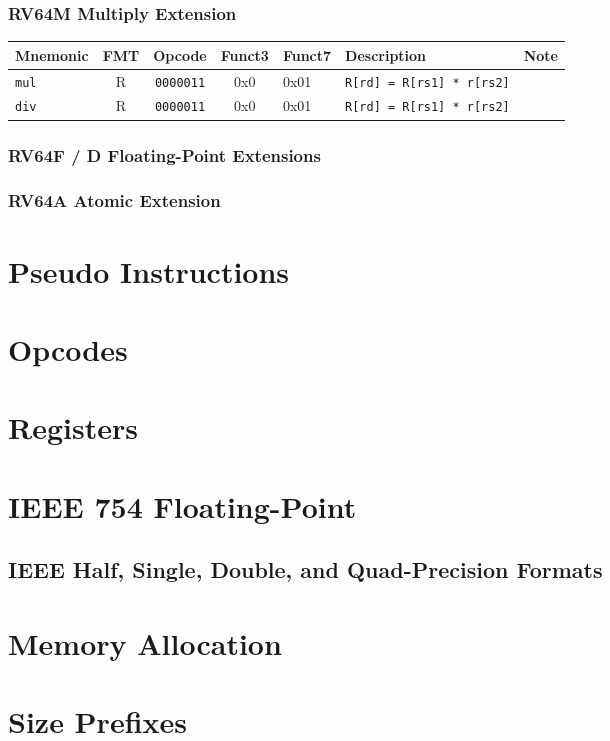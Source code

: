 \documentclass{article}
\newcommand{\code}[1]{\texttt{#1}}
\begin{document}
\subsubsection*{RV64M Multiply Extension}
\begin{tabular}
{l | c | c | c | l | l | r}
Mnemonic    & FMT   & Opcode         & Funct3 & Funct7  & Description   & Note \\ \hline
\code{mul}  & R     & \code{0000011} & 0x0    & 0x01 &\code{R[rd] = R[rs1] * r[rs2]} \\
\code{div}  & R     & \code{0000011} & 0x0    & 0x01 &\code{R[rd] = R[rs1] * r[rs2]} \\
\end{tabular}

\subsubsection*{RV64F / D Floating-Point Extensions}

\subsubsection*{RV64A Atomic Extension}

\section*{Pseudo Instructions}

\section*{Opcodes}

\section*{Registers}

\section*{IEEE 754 Floating-Point}

\subsection*{IEEE Half, Single, Double, and Quad-Precision Formats}

\section*{Memory Allocation}

\section*{Size Prefixes}
\end{document}
